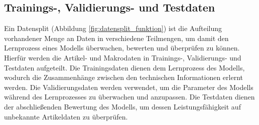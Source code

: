 \subsection{Trainings-, Validierungs- und Testdaten}

Ein Datensplit (Abbildung \ref{fig:datensplit_funktion}) ist die Aufteilung vorhandener Menge an Daten in verschiedene Teilmengen, um damit den Lernprozess eines Modells überwachen, bewerten und überprüfen zu können.
Hierfür werden die Artikel- und Makrodaten in Trainings-, Validierungs- und Testdaten aufgeteilt.
Die Trainingsdaten dienen dem Lernprozess des Modells, wodurch die Zusammenhänge zwischen den technischen Informationen erlernt werden. 
Die Validierungsdaten werden verwendet, um die Parameter des Modells während des Lernprozesses zu überwachen und anzupassen. 
Die Testdaten dienen der abschließenden Bewertung des Modells, um dessen Leistungsfähigkeit auf unbekannte Artikeldaten zu überprüfen. 


